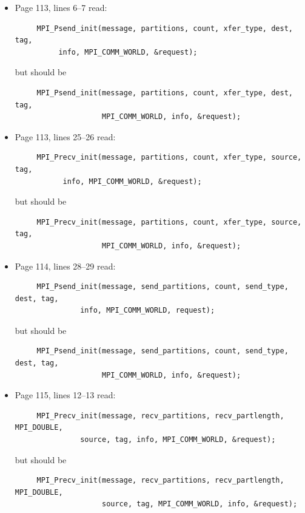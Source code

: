 \begin{itemize}

%
%
%
%
\item Page 113, lines 6--7 read:
\begin{verbatim}
     MPI_Psend_init(message, partitions, count, xfer_type, dest, tag,
          info, MPI_COMM_WORLD, &request);
\end{verbatim}
but should be
\begin{verbatim}
     MPI_Psend_init(message, partitions, count, xfer_type, dest, tag,
                    MPI_COMM_WORLD, info, &request);
\end{verbatim}

\item Page 113, lines 25--26 read:
\begin{verbatim}
     MPI_Precv_init(message, partitions, count, xfer_type, source, tag,
           info, MPI_COMM_WORLD, &request);
\end{verbatim}
but should be
\begin{verbatim}
     MPI_Precv_init(message, partitions, count, xfer_type, source, tag,
                    MPI_COMM_WORLD, info, &request);
\end{verbatim}

\item Page 114, lines 28--29 read:
\begin{verbatim}
     MPI_Psend_init(message, send_partitions, count, send_type, dest, tag,
               info, MPI_COMM_WORLD, request);
\end{verbatim}
but should be
\begin{verbatim}
     MPI_Psend_init(message, send_partitions, count, send_type, dest, tag,
                    MPI_COMM_WORLD, info, &request);
\end{verbatim}

\item Page 115, lines 12--13 read:
\begin{verbatim}
     MPI_Precv_init(message, recv_partitions, recv_partlength, MPI_DOUBLE,
               source, tag, info, MPI_COMM_WORLD, &request);
\end{verbatim}
but should be
\begin{verbatim}
     MPI_Precv_init(message, recv_partitions, recv_partlength, MPI_DOUBLE,
                    source, tag, MPI_COMM_WORLD, info, &request);
\end{verbatim}


\end{itemize}
